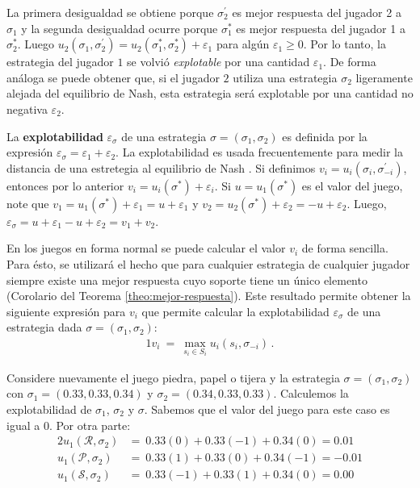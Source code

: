 La primera desigualdad se obtiene porque $\sigma^{\prime}_2$ es mejor respuesta del jugador 2 a $\sigma_1$ y la segunda desigualdad ocurre porque $\sigma^*_1$ es mejor respuesta del jugador 1 a $\sigma^*_2$. Luego $u_2(\sigma_1, \sigma^{\prime}_2) = u_2(\sigma^*_1, \sigma^*_2) + \varepsilon_1$ para algún $\varepsilon_1 \geq 0$. Por lo tanto, la estrategia del jugador $1$ se volvió \textit{explotable} por una cantidad $\varepsilon_1$. De forma análoga se puede obtener que, si el jugador $2$ utiliza una estrategia $\sigma_2$ ligeramente alejada del equilibrio de Nash, esta estrategia será explotable por una cantidad no negativa $\varepsilon_2$.

La \textbf{explotabilidad} $\varepsilon_\sigma$ de una estrategia $\sigma = (\sigma_1, \sigma_2)$ es definida por la expresión $\varepsilon_{\sigma} = \varepsilon_1 + \varepsilon_2$. La explotabilidad es usada frecuentemente para medir la distancia de una estretegia al equilibrio de Nash \cite[p. 7]{bib:thesis-marc-lanctot}. Si definimos $v_i = u_i(\sigma_i, \sigma^{\prime}_{-i})$, entonces por lo anterior $v_i = u_i(\sigma^*) + \varepsilon_i$. Si $u=u_1(\sigma^*)$ es el valor del juego, note que $v_1 = u_1(\sigma^*) + \varepsilon_1 = u + \varepsilon_1$ y $v_2 = u_2(\sigma^*) + \varepsilon_2 = -u + \varepsilon_2$. Luego, $\varepsilon_{\sigma} = u + \varepsilon_1 - u + \varepsilon_2 =  v_1 + v_2$.

En los juegos en forma normal se puede calcular el valor $v_i$ de forma sencilla. Para ésto, se utilizará el hecho que para cualquier estrategia de cualquier jugador siempre existe una mejor respuesta cuyo soporte tiene un único elemento (Corolario del Teorema \ref{theo:mejor-respuesta}). Este resultado permite obtener la siguiente expresión para $v_i$ que permite calcular la explotabilidad $\varepsilon_\sigma$ de una estrategia dada $\sigma=(\sigma_1,\sigma_2)$:
\begin{alignat}{1}
\label{eq:best-response-fn}
v_i\ =\ \max_{s_{i} \in S_{i}} u_i(s_i, \sigma_{-i}) \,.
\end{alignat}

Considere nuevamente el juego piedra, papel o tijera y la estrategia $\sigma = (\sigma_1, \sigma_2)$ con $\sigma_1 = (0.33, 0.33, 0.34)$ y $\sigma_2 = (0.34, 0.33, 0.33)$. Calculemos la explotabilidad de $\sigma_1$, $\sigma_2$ y $\sigma$. Sabemos que el valor del juego para este caso es igual a $0$. Por otra parte:
\begin{alignat}{2}
u_1(\mathcal{R}, \sigma_2) &=\  0.33(0) + 0.33(-1) +  0.34(0) =  0.01 \\
u_1(\mathcal{P}, \sigma_2) &=\  0.33(1) +  0.33(0) + 0.34(-1) = -0.01 \\
u_1(\mathcal{S}, \sigma_2) &=\ 0.33(-1) +  0.33(1) +  0.34(0) =  0.00
\end{alignat}

